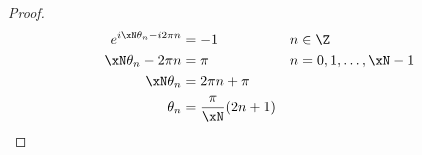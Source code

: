 \begin{lemma}
\end{lemma}
\begin{proof}
\begin{align*}
  e^{i\xN\theta_n - i2\pi n} &= -1                     && n\in\Z   \\
  \xN\theta_n - 2\pi n       &= \pi                    && n=0,1,\ldots,\xN-1   \\
  \xN\theta_n                &=  2\pi n + \pi                                   \\
  \theta_n                 &=  \frac{\pi}{\xN}(2n + 1) 
\end{align*}
\end{proof}





